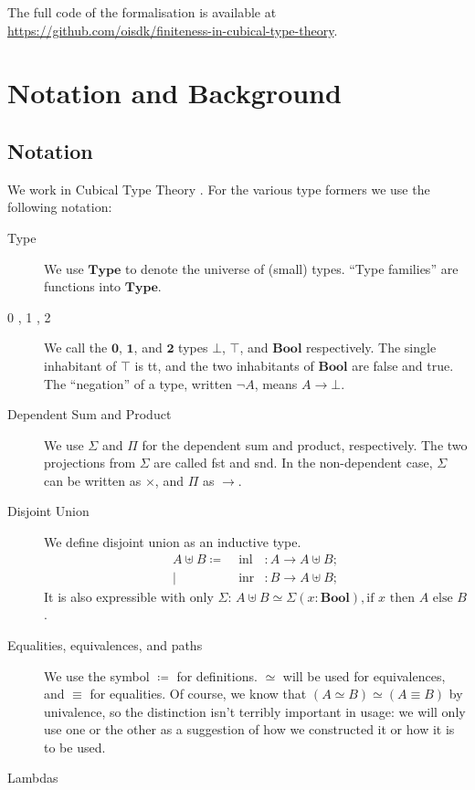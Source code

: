 The full code of the formalisation is available at
\url{https://github.com/oisdk/finiteness-in-cubical-type-theory}.
\section{Notation and Background}
\subsection{Notation}
We work in Cubical Type Theory \cite{cohenCubicalTypeTheory2016}.
For the various type formers we use the following notation:
\begin{description}
  \item[Type] We use \(\mathbf{Type}\) to denote the universe of (small) types.
    ``Type families'' are functions into \(\mathbf{Type}\).
  \item[0 , 1 , 2] We call the \(\mathbf{0}\), \(\mathbf{1}\), and
    \(\mathbf{2}\) types \(\bot\), \(\top\), and \(\mathbf{Bool}\) respectively.
    The single inhabitant of \(\top\) is tt, and the two inhabitants of
    \(\mathbf{Bool}\) are false and true.
    The ``negation'' of a type, written \(\neg A\), means \(A \rightarrow
    \bot\).
  \item[Dependent Sum and Product] We use \(\Sigma\) and \(\Pi\) for the
    dependent sum and product, respectively.
    The two projections from \(\Sigma\) are called fst and snd.
    In the non-dependent case, \(\Sigma\) can be written as \(\times\), and
    \(\Pi\) as \(\rightarrow\).
  \item[Disjoint Union] We define disjoint union as an inductive type.
    \begin{equation}
      \begin{alignedat}{3}
        A \uplus B \coloneqq & \;
        \text{inl} &: A \rightarrow A \uplus B ; \\
        | & \;  \text{inr} &: B \rightarrow A \uplus B ;
      \end{alignedat}
    \end{equation}
    It is also expressible with only \(\Sigma\):
    \(A \uplus B \simeq \Sigma(x : \mathbf{Bool}) , \text{if } x \text{ then
    } A \text{ else } B \).
  \item[Equalities, equivalences, and paths] We use the symbol \(\coloneqq\)
    for definitions.
    \(\simeq\) will be used for equivalences, and \(\equiv\) for equalities.
    Of course, we know that \((A \simeq B) \simeq (A \equiv B)\) by univalence,
    so the distinction isn't terribly important in usage: we will only use one
    or the other as a suggestion of how we constructed it or how it is to be
    used.
  \item[Lambdas] 
\end{description}
